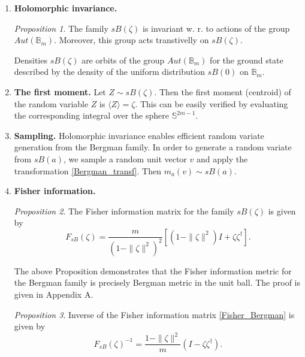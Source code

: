 \documentclass{article}
\theoremstyle{plain}%
\theoremstyle{definition}
\theoremstyle{remark}
\theoremstyle{prop}
\newtheorem{prop}{Proposition}
\begin{document}
\begin{enumerate}

\item[i)] {\bf Holomorphic invariance.}

\begin{prop}
The family $sB(\zeta)$ is invariant w. r. to actions of the group $Aut(\mathbb{B}_m)$. Moreover, this group acts transtivelly on $sB(\zeta)$.
\end{prop}

Densities $sB(\zeta)$ are orbits of the group $Aut(\mathbb{B}_m)$ for the ground state described by the density of the uniform distribution $sB(0)$ on $\mathbb{B}_m$.

\item[ii)] {\bf The first moment.}
Let $Z \sim sB(\zeta)$. Then the first moment (centroid) of the random variable $Z$ is $\langle Z \rangle = \zeta$. This can be easily verified by evaluating the corresponding integral over the sphere ${\mathbb S}^{2m-1}$.

\item[iii)] {\bf Sampling.}
Holomorphic invariance enables efficient random variate generation from the Bergman family. In order to generate a random variate from $sB(a)$, we sample a random unit vector $v$ and apply the transformation \eqref{Bergman_transf}. Then $m_a(v) \sim sB(a)$.

\item [iv)] {\bf Fisher information.}

\begin{prop}
\label{Fisher_info_Bergman_prop}
The Fisher information matrix for the family $sB(\zeta)$ is given by
\begin{equation}
\label{Fisher_Bergman}
F_{sB}(\zeta) = \frac{m}{(1 - \| \zeta \|^2)^2}\left[ (1 - \| \zeta \|^2) I + \zeta \zeta^\dagger \right].
\end{equation}
\end{prop}

The above Proposition demonstrates that the Fisher information metric for the Bergman family is precisely Bergman metric in the unit ball. The proof is given in Appendix A.

\begin{prop}
\label{inverse_Fisher_Bergman_prop}
Inverse of the Fisher information matrix \eqref{Fisher_Bergman} is given by
\begin{equation}
\label{inverse_Fisher_Bergman}
F_{sB}(\zeta)^{-1} = \frac{1 - \| \zeta \|^2}{m} (I - \zeta \zeta^\dagger).
\end{equation}
\end{prop}


\end{enumerate}
\end{document}
